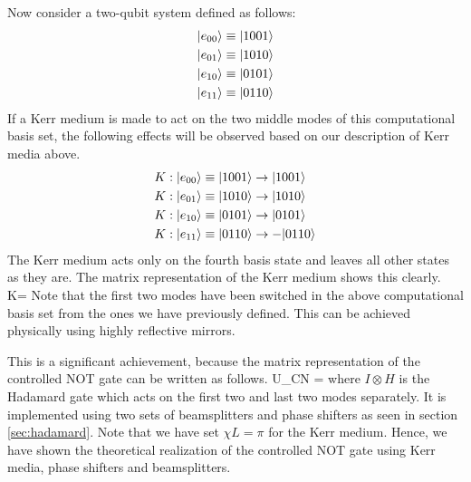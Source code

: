 Now consider a two-qubit system defined as follows:
\begin{align}
|e_{00}\rangle &\equiv |1001\rangle\\
|e_{01}\rangle &\equiv |1010\rangle\\
|e_{10}\rangle &\equiv |0101\rangle\\
|e_{11}\rangle &\equiv |0110\rangle
\end{align}
If a Kerr medium is made to act on the two middle modes of this computational basis set, the following effects will be observed based on our description of Kerr media above.
\begin{align}
K:|e_{00}\rangle &\equiv |1001\rangle\rightarrow |1001\rangle\\
K:|e_{01}\rangle &\equiv |1010\rangle\rightarrow |1010\rangle\\
K:|e_{10}\rangle &\equiv |0101\rangle\rightarrow |0101\rangle\\
K:|e_{11}\rangle &\equiv |0110\rangle\rightarrow -|0110\rangle
\end{align}
The Kerr medium acts only on the fourth basis state and leaves all other states as they are. The matrix representation of the Kerr medium shows this clearly.
\beq
K= 
\eeq
Note that the first two modes have been switched in the above computational basis set from the ones we have previously defined. This can be achieved physically using highly reflective mirrors.

This is a significant achievement, because the matrix representation of the controlled NOT gate can be written as follows.
\beq
U_{CN} = 
\eeq
where $I\otimes H$ is the Hadamard gate which acts on the first two and last two modes separately. It is implemented using two sets of beamsplitters and phase shifters as seen in section \ref{sec:hadamard}. Note that we have set $\chi L = \pi$ for the Kerr medium. Hence, we have shown the theoretical realization of the controlled NOT gate using Kerr media, phase shifters and beamsplitters.

